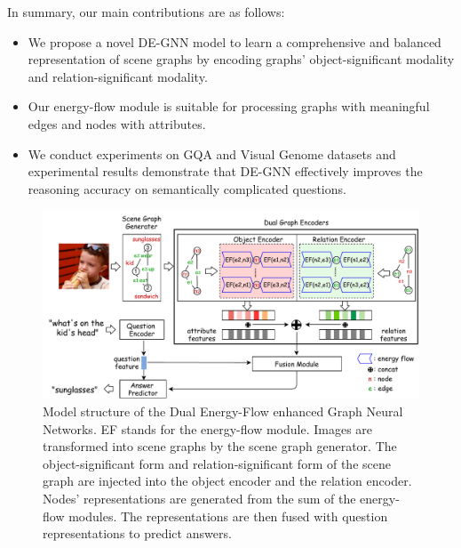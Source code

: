 \documentclass[letterpaper]{article} %
\begin{document}
In summary, our main contributions are as follows:%
\begin{itemize}
\setlength{\itemsep}{5pt}
\setlength{\parsep}{5pt}
\setlength{\parskip}{5pt}
\item We propose a novel DE-GNN model to learn a comprehensive and balanced representation of scene graphs by encoding graphs' object-significant modality and relation-significant modality.\vspace{-0.06in}

\item Our energy-flow module is suitable for processing graphs with meaningful edges and nodes with attributes.\vspace{-0.06in}

\item We conduct experiments on GQA and Visual Genome datasets and experimental results demonstrate that DE-GNN effectively improves the reasoning accuracy on semantically complicated questions.
\end{itemize}\vspace{-0.06in}

\begin{figure}[ht] 
    \centering 
    \includegraphics[width=1.0\textwidth]{./pic/DE-GNN.pdf} 
    \caption{Model structure of the Dual Energy-Flow enhanced Graph Neural Networks. EF stands for the energy-flow module. Images are transformed into scene graphs by the scene graph generator. The object-significant form and relation-significant form of the scene graph are injected into the object encoder and the relation encoder. Nodes' representations are generated from the sum of the energy-flow modules. The representations are then fused with question representations to predict answers.} 
    \label{fig2} 
\end{figure}
\end{document}
